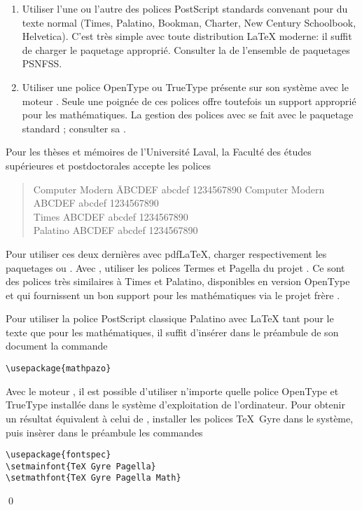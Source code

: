 \begin{enumerate}
\item Utiliser l'une ou l'autre des polices PostScript standards
  convenant pour du texte normal
  ({\Times Times}, %
   {\Palatino Palatino}, %
   {\Bookman Bookman}, %
   {\Charter Charter}, %
   {\NewCent New Century Schoolbook}, %
   {\Helvet Helvetica}). %
  C'est très simple avec toute distribution {\LaTeX} moderne: il
  suffit de charger le paquetage approprié. Consulter la %
  de l'ensemble de paquetages PSNFSS.
\item Utiliser une police OpenType ou TrueType présente sur son
  système avec le moteur {\XeLaTeX}. Seule une poignée de ces polices
  offre toutefois un support approprié pour les mathématiques. La
  gestion des polices avec {\XeLaTeX} se fait avec le paquetage
  standard ; consulter sa %
  .
\end{enumerate}

Pour les thèses et mémoires de l'Université Laval, la Faculté des
études supérieures et postdoctorales accepte les polices %
\begin{quote}
  \begin{tabbing}
    Computer Modern \qquad \=  ABCDEF abcdef 1234567890 \kill
    {\CM Computer Modern} \> {\CM ABCDEF abcdef 1234567890} \\
    {\Times Times} \> {\Times ABCDEF abcdef 1234567890} \\
    {\Palatino Palatino} \> {\Palatino ABCDEF abcdef 1234567890}
  \end{tabbing}
\end{quote}
Pour utiliser ces deux dernières avec pdf{\LaTeX}, charger
respectivement les paquetages  ou . Avec
{\XeLaTeX}, utiliser les polices Termes et Pagella du projet %
.
Ce sont des polices très similaires à Times et Palatino, disponibles
en version OpenType et qui fournissent un bon support pour les
mathématiques via le projet frère %
.

\begin{exemple}
  \label{ex:trucs:palatino}
  Pour utiliser la police PostScript classique Palatino avec {\LaTeX}
  tant pour le texte que pour les mathématiques, il suffit d'insérer
  dans le préambule de son document la commande
\begin{lstlisting}
\usepackage{mathpazo}
\end{lstlisting}

  Avec le moteur {\XeLaTeX}, il est possible d'utiliser n'importe
  quelle police OpenType et TrueType installée dans le système
  d'exploitation de l'ordinateur. Pour obtenir un résultat équivalent
  à celui de , installer les polices TeX~Gyre dans le
  système, puis insèrer dans le préambule les commandes
\begin{lstlisting}
\usepackage{fontspec}
\setmainfont{TeX Gyre Pagella}
\setmathfont{TeX Gyre Pagella Math}
\end{lstlisting}
  \qed
\end{exemple}

